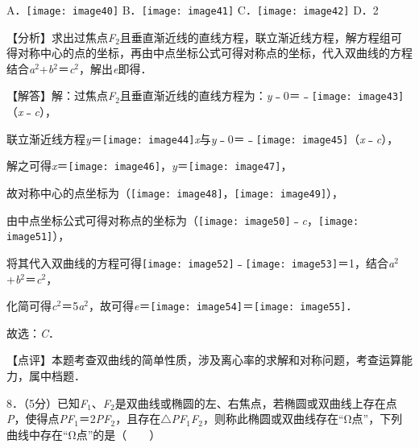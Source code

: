 \documentclass[a4paper,11pt,UTF8,twoside]{ctexart} %
\begin{document}
A．\texttt{[image: image40]} B．\texttt{[image: image41]} C．\texttt{[image: image42]} D．2

【分析】求出过焦点\textit{F}${}_{2}$且垂直渐近线的直线方程，联立渐近线方程，解方程组可得对称中心的点的坐标，再由中点坐标公式可得对称点的坐标，代入双曲线的方程结合\textit{a}${}^{2}$+\textit{b}${}^{2}$＝\textit{c}${}^{2}$，解出\textit{e}即得．

【解答】解：过焦点\textit{F}${}_{2}$且垂直渐近线的直线方程为：\textit{y}﹣0＝﹣\texttt{[image: image43]}（\textit{x}﹣\textit{c}），

联立渐近线方程\textit{y}＝\texttt{[image: image44]}\textit{x}与\textit{y}﹣0＝﹣\texttt{[image: image45]}（\textit{x}﹣\textit{c}），

解之可得\textit{x}＝\texttt{[image: image46]}，\textit{y}＝\texttt{[image: image47]}，

故对称中心的点坐标为（\texttt{[image: image48]}，\texttt{[image: image49]}），

由中点坐标公式可得对称点的坐标为（\texttt{[image: image50]}﹣\textit{c}，\texttt{[image: image51]}），

将其代入双曲线的方程可得\texttt{[image: image52]}﹣\texttt{[image: image53]}＝1，结合\textit{a}${}^{2}$+\textit{b}${}^{2}$＝\textit{c}${}^{2}$，

化简可得\textit{c}${}^{2}$＝5\textit{a}${}^{2}$，故可得\textit{e}＝\texttt{[image: image54]}＝\texttt{[image: image55]}．

故选：\textit{C}．

【点评】本题考查双曲线的简单性质，涉及离心率的求解和对称问题，考查运算能力，属中档题．

8．（5分）已知\textit{F}${}_{1}$、\textit{F}${}_{2}$是双曲线或椭圆的左、右焦点，若椭圆或双曲线上存在点\textit{P}，使得点{\textbar}\textit{PF}${}_{1}${\textbar}＝2{\textbar}\textit{PF}${}_{2}${\textbar}，且存在$\mathrm{\triangle}$\textit{PF}${}_{1}$\textit{F}${}_{2}$，则称此椭圆或双曲线存在``$\mathrm{\Omega }$点''，下列曲线中存在``$\mathrm{\Omega }$点''的是（　　）
\end{document}
